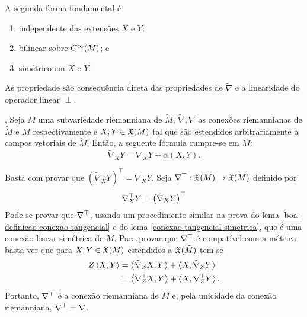 \begin{proposicao}
	A segunda forma fundamental é
	\begin{enumerate}
		\item independente das extensões $X$ e $Y$;
		\item bilinear sobre $C^\infty(M)$; e
		\item simétrico em $X$ e $Y$.
	\end{enumerate}
\end{proposicao}

\begin{demonstracao}
	As propriedade são consequência direta das propriedades de $\tilde{\nabla}$ e a linearidade do operador linear $\perp$. 
\end{demonstracao}

\begin{teorema}\label{formula-de-gauss},
	Seja $M$ uma subvariedade riemanniana de $\tilde{M}$,
	$\tilde{\nabla}, \nabla$ as conexões riemannianas de $\tilde{M}$ e $M$ respectivamente e
	$X,Y \in \mathfrak{X}(M)$ tal que são estendidos arbitrariamente a campos vetoriais de $\tilde{M}$.
	Então, a seguente fórmula cumpre-se em $M$:
	\begin{equation*}
		\tilde{\nabla}_X Y = \nabla_X Y + \alpha(X,Y).
	\end{equation*}
\end{teorema}

\begin{demonstracao}
	Basta com provar que $\left(\tilde{\nabla}_X Y\right)^\top = \nabla_X Y$. 
	Seja $\nabla^\top: \mathfrak{X}(M) \rightarrow \mathfrak{X}(M)$ definido por
	\begin{equation*}
		\nabla^\top_X Y = \left(\tilde{\nabla}_X Y\right)^\top	
	\end{equation*}
	Pode-se provar que $\nabla^\top$, usando um procedimento similar na prova do lema \ref{boa-definicao-conexao-tangencial} e do lema \ref{conexao-tangencial-simetrica}, que é uma conexão linear simétrica de $M$. Para provar que $\nabla^\top$ é compatível com a métrica basta ver que para $X,Y \in \mathfrak{X}(M)$ estendidos a $\mathfrak{X}(\tilde{M})$ tem-se
	\begin{align*}
		Z \left\langle X,Y \right\rangle &= \left\langle \tilde{\nabla}_Z X,Y \right\rangle + \left\langle X,\tilde{\nabla}_Z Y \right\rangle\\
		&= \left\langle \nabla^\top_Z X,Y \right\rangle + \left\langle X,\nabla^\top_Z Y \right\rangle.
	\end{align*}
	Portanto, $\nabla^\top$ é a conexão riemanniana de $M$ e, pela unicidade da conexão riemanniana, $\nabla^\top = \nabla$.
\end{demonstracao}

